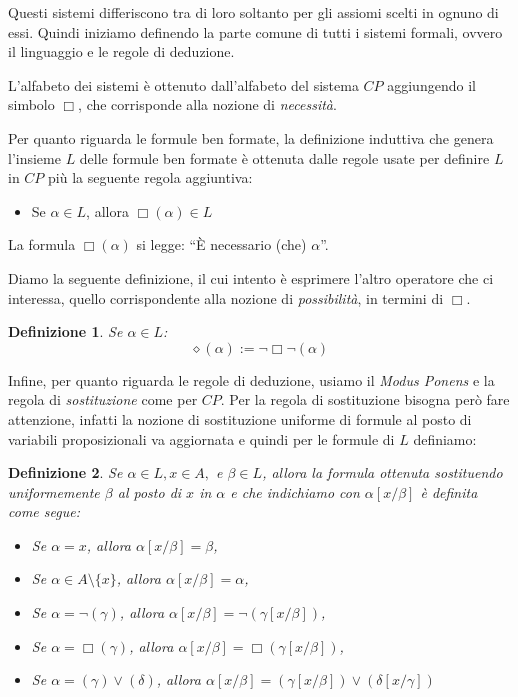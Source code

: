 \documentclass[a4paper, titlepage, 12pt]{report}
\newtheorem{definition}{Definizione}[chapter]
\begin{document}
Questi sistemi differiscono tra di loro soltanto per gli assiomi scelti in ognuno di essi.
Quindi iniziamo definendo la parte comune di tutti i sistemi formali, ovvero il linguaggio
e le regole di deduzione.

L'alfabeto dei sistemi è ottenuto dall'alfabeto del sistema $CP$ aggiungendo il simbolo $\Box$,
che corrisponde alla nozione di \emph{necessità}.

Per quanto riguarda le formule ben formate, la definizione induttiva che genera l'insieme $L$
delle formule ben formate è ottenuta dalle regole usate per definire $L$ in $CP$ più
la seguente regola aggiuntiva:
\begin{itemize}
\item Se $\alpha \in L$, allora $\Box (\alpha) \in L$
\end{itemize}

La formula $\Box (\alpha)$ si legge: ``È necessario (che) $\alpha$''.

Diamo la seguente definizione, il cui intento è esprimere l'altro operatore
che ci interessa, quello corrispondente alla nozione di \emph{possibilità},
in termini di $\Box$.

\begin{definition}
Se $\alpha \in L$:
$$\diamond (\alpha) := \neg \Box \neg (\alpha)$$
\end{definition}

Infine, per quanto riguarda le regole di deduzione,
usiamo il \emph{Modus Ponens} e la regola di \emph{sostituzione}
come per $CP$. Per la regola di sostituzione bisogna però fare attenzione,
infatti la nozione di sostituzione uniforme di formule al posto di variabili
proposizionali va aggiornata e quindi per le formule di $L$ definiamo:

\begin{definition}
Se $\alpha \in L, x \in A,$ e $\beta \in L$, allora la formula
ottenuta sostituendo uniformemente $\beta$ al posto di $x$ in $\alpha$
e che indichiamo con $\alpha[x/\beta]$ è definita come segue:
\begin{itemize}
\item Se $\alpha = x$, allora $\alpha[x/\beta] = \beta$,
\item Se $\alpha \in A \setminus \{x\}$, allora $\alpha[x/\beta] = \alpha$,
\item Se $\alpha = \neg (\gamma)$, allora $\alpha[x/\beta] = \neg (\gamma[x/\beta])$,
\item Se $\alpha = \Box (\gamma)$, allora $\alpha[x/\beta] = \Box (\gamma[x/\beta])$,
\item Se $\alpha = (\gamma) \lor (\delta)$,
      allora $\alpha[x/\beta] = (\gamma[x/\beta]) \lor (\delta[x/\gamma])$
\end{itemize}
\end{definition}
\end{document}
